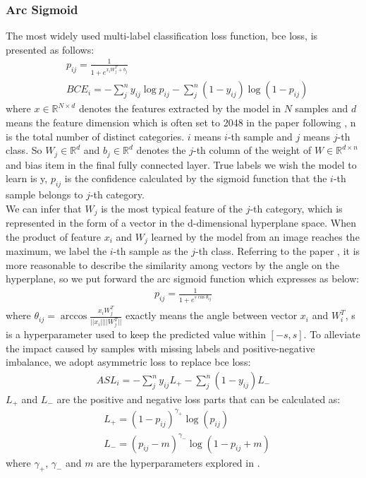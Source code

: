 \documentclass{article} \usepackage[numbers,sort&compress]{natbib}
\begin{document}
\subsubsection{Arc Sigmoid}
The most widely used multi-label classification loss function, bce loss, is presented as follows:
\begin{eqnarray}
 &p_{ij} = \frac{1}{1+e^{x_{i}W_j^T+b_j}}\\
 &BCE_i = -\sum_{j}^{n}{y_{ij}}\log{p_{ij}}-\sum_{j}^{n}{(1-y_{ij})}\log(1-p_{ij})
\end{eqnarray}
where $x \in \mathbb{R}^{N\times{d}}$ denotes the features extracted by the model in $N$ samples and $d$ means the feature dimension which is often set to 2048 in the paper following \cite{he2016deep}, n is the total number of distinct categories. $i$ means $i$-th sample and $j$ means $j$-th class. So $W_j \in \mathbb{R}^{d}$ and $b_j \in \mathbb{R}^{d}$ denotes the $j$-th column of the weight of $W \in \mathbb{R}^{d\times{n}}$
and bias item in the final fully connected layer. True labels we wish the model to learn is y, $p_{ij}$ is the confidence calculated by the sigmoid function that the $i$-th sample belongs to $j$-th category.\\
We can infer that $W_j$ is the most typical feature of the $j$-th category, which is represented in the form of a vector in the d-dimensional hyperplane space. When the product of feature $x_i$ and $W_j$ learned by the model from an image reaches the maximum, we label the $i$-th sample as the $j$-th class. Referring to the paper \cite{deng2019arcface,liu2017sphereface,liu2016large}, it is more reasonable to describe the similarity among vectors by the angle on the hyperplane, so we put forward the arc sigmoid function which expresses as below:
\begin{eqnarray}
p_{ij} = \frac{1}{1+e^{s\cos\theta_{ij}}}
\label{arc_sig}
\end{eqnarray}
where $\theta_{ij} = \arccos\frac{x_{i}W_j^T}{||x_{i}||||W_j^T||}$ exactly means the angle between vector $x_{i}$ and $W_i^T$, s is a hyperparameter used to keep the predicted value within $[-s, s]$.
To alleviate the impact caused by samples with missing labels and positive-negative imbalance, we adopt asymmetric loss \cite{ben2020asymmetric} to replace bce loss:
\begin{eqnarray}
ASL_{i} = -\sum_{j}^{n}y_{ij}L_+-\sum_{j}^{n}(1-y_{ij})L_-
\end{eqnarray}
$L_+$ and $L_-$ are the positive and negative loss parts that can be calculated as:
\begin{eqnarray}
 &L_+ = (1-p_{ij})^{\gamma_{+}}\log(p_{ij}) \\
 &L_- = (p_{ij}-m)^{\gamma_-}\log(1-p_{ij}+m)
\end{eqnarray}
where $\gamma_{+}$, $\gamma_{-}$ and $m$ are the hyperparameters explored in \cite{ben2020asymmetric}.
\end{document}

